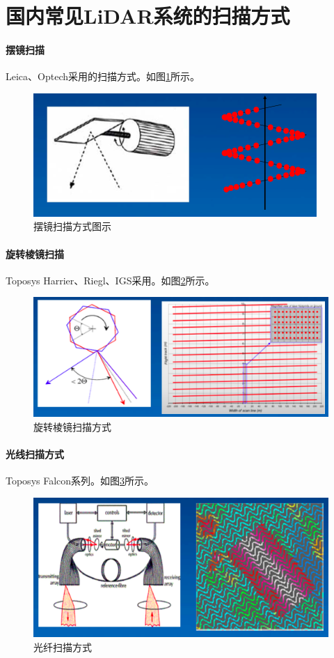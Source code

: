 \section{国内常见LiDAR系统的扫描方式}
\paragraph{摆镜扫描}Leica、Optech采用的扫描方式。如图\ref{fig:摆镜扫描方式}所示。
\begin{figure}[htbp]
	\centering
	\includegraphics[width=0.5\linewidth]{figure/Chapter1/摆镜扫描方式}
	\caption{摆镜扫描方式图示}
	\label{fig:摆镜扫描方式}
\end{figure}
\paragraph{旋转棱镜扫描}Toposys Harrier、Riegl、IGS采用。如图\ref{fig:旋转棱镜扫描方式}所示。
\begin{figure}[htbp]
	\centering
	\includegraphics[width=0.5\linewidth]{figure/Chapter1/旋转棱镜扫描方式}
	\caption{旋转棱镜扫描方式}
	\label{fig:旋转棱镜扫描方式}
\end{figure}
\paragraph{光线扫描方式}Toposys Falcon系列。如图\ref{fig:光纤扫描方式}所示。
\begin{figure}[htbp]
	\centering
	\includegraphics[width=0.5\linewidth]{figure/Chapter1/光纤扫描方式}
	\caption{光纤扫描方式}
	\label{fig:光纤扫描方式}
\end{figure}
